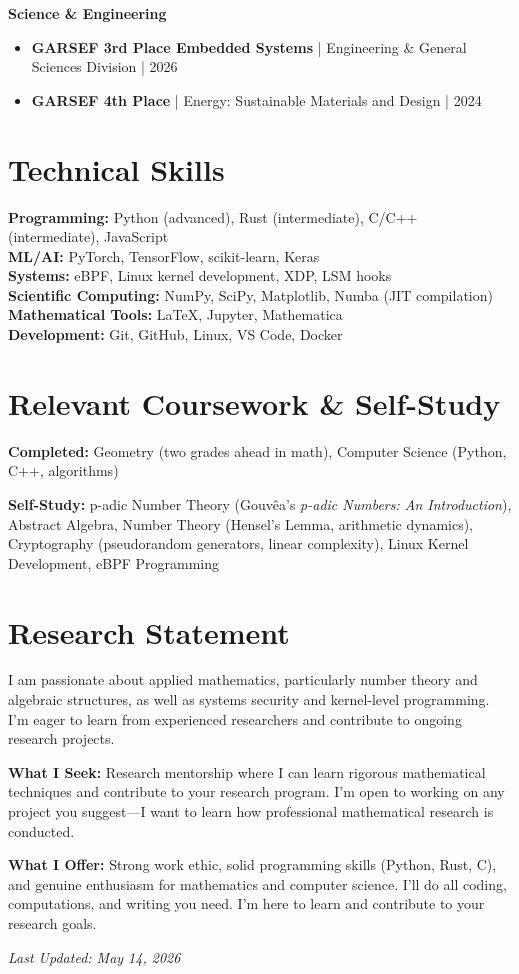 \documentclass[11pt,letterpaper]{article}
\begin{document}
\textbf{Science \& Engineering}
\begin{itemize}[leftmargin=1.5em,itemsep=2pt]
\item \textbf{GARSEF 3rd Place Embedded Systems} | Engineering \& General Sciences Division | 2026
\item \textbf{GARSEF 4th Place} | Energy: Sustainable Materials and Design | 2024
\end{itemize}

\section{Technical Skills}

\textbf{Programming:} Python (advanced), Rust (intermediate), C/C++ (intermediate), JavaScript\\
\textbf{ML/AI:} PyTorch, TensorFlow, scikit-learn, Keras\\
\textbf{Systems:} eBPF, Linux kernel development, XDP, LSM hooks\\
\textbf{Scientific Computing:} NumPy, SciPy, Matplotlib, Numba (JIT compilation)\\
\textbf{Mathematical Tools:} LaTeX, Jupyter, Mathematica\\
\textbf{Development:} Git, GitHub, Linux, VS Code, Docker

\section{Relevant Coursework \& Self-Study}

\textbf{Completed:} Geometry (two grades ahead in math), Computer Science (Python, C++, algorithms)

\textbf{Self-Study:} p-adic Number Theory (Gouv\^ea's \textit{p-adic Numbers: An Introduction}), Abstract Algebra, Number Theory (Hensel's Lemma, arithmetic dynamics), Cryptography (pseudorandom generators, linear complexity), Linux Kernel Development, eBPF Programming

\section{Research Statement}

I am passionate about applied mathematics, particularly number theory and algebraic structures, as well as systems security and kernel-level programming. I'm eager to learn from experienced researchers and contribute to ongoing research projects.

\textbf{What I Seek:} Research mentorship where I can learn rigorous mathematical techniques and contribute to your research program. I'm open to working on any project you suggest---I want to learn how professional mathematical research is conducted.

\textbf{What I Offer:} Strong work ethic, solid programming skills (Python, Rust, C), and genuine enthusiasm for mathematics and computer science. I'll do all coding, computations, and writing you need. I'm here to learn and contribute to your research goals.

\vspace{10pt}
\begin{center}
\textit{\small Last Updated: May 14, 2026}
\end{center}
\end{document}
